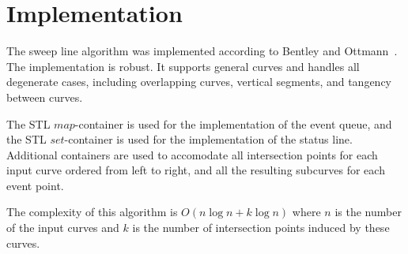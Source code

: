 \section{Implementation}

The sweep line algorithm was implemented according to Bentley and
Ottmann~\cite{bkos-cgaa-97}. The implementation is robust. It supports general
curves and handles all degenerate cases, including overlapping curves,
vertical segments, and tangency between curves.

The STL $map$-container is used for the implementation of the event queue, and
the STL $set$-container is used for the implementation of the status line.
Additional containers are used to accomodate all intersection points for each
input curve ordered from left to right, and all the resulting subcurves for
each event point. 

The complexity of this algorithm is $O(n\log{n} + k\log{n})$ where $n$ is the 
number of the input curves and $k$ is the number of intersection points 
induced by these curves.
